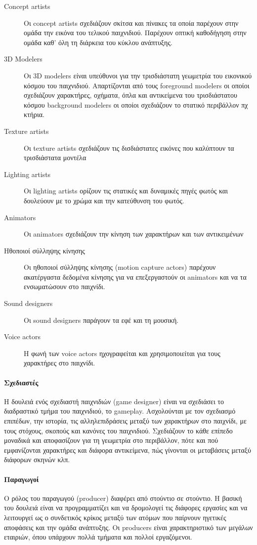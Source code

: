 	\begin{description}
		\item [Concept artists] 
		Οι concept artists σχεδιάζουν σκίτσα και πίνακες τα οποία παρέχουν στην ομάδα την εικόνα του τελικού παιχνιδιού. Παρέχουν οπτική καθοδήγηση στην ομάδα καθ' όλη τη διάρκεια του κύκλου ανάπτυξης.
		\item [3D Modelers]
	    Οι 3D modelers είναι υπεύθυνοι για την τρισδιάστατη γεωμετρία του εικονικού κόσμου του παιχνιδιού. Απαρτίζονται από τους
		foreground modelers οι οποίοι σχεδιάζουν χαρακτήρες, οχήματα, όπλα και αντικείμενα του τρισδιάστατου κόσμου
		background modelers οι οποίοι σχεδιάζουν το στατικό περιβάλλον πχ κτήρια.
		\item [Texture artists] Οι texture artists σχεδιάζουν τις δισδιάστατες εικόνες που καλύπτουν τα τρισδιάστατα μοντέλα
		\item [Lighting artists] Οι lighting artists ορίζουν τις στατικές και δυναμικές πηγές φωτός και δουλεύουν με το χρώμα και την κατεύθυνση του φωτός.
		\item [Animators] Οι animators σχεδιάζουν την κίνηση των χαρακτήρων και των αντικειμένων
		\item [Ηθοποιοί σύλληψης κίνησης] Οι ηθοποιοί σύλληψης κίνησης (motion capture actors) παρέχουν ακατέργαστα δεδομένα κίνησης για να επεξεργαστούν οι animators και να τα ενσωματώσουν στο παιχνίδι.
		\item [Sound designers] Οι sound designers παράγουν τα εφέ και τη μουσική.
		\item [Voice actors] H φωνή των voice actors ηχογραφείται και χρησιμοποιείται για τους χαρακτήρες στο παιχνίδι.
	\end{description}
	
	\paragraph{Σχεδιαστές}
	Η δουλειά ενός σχεδιαστή παιχνιδιών (game designer) είναι να σχεδιάσει το διαδραστικό τμήμα του παιχνιδιού, το gameplay. Ασχολούνται με τον σχεδιασμό επιπέδων, την ιστορία, τις αλληλεπιδράσεις μεταξύ των χαρακτήρων στο παιχνίδι, με τους στόχους, σκοπούς και κανόνες του παιχνιδιού.
	Σχεδιάζουν το κάθε επίπεδο μοναδικά και αποφασίζουν για τη γεωμετρία στο περιβάλλον, πότε και πού εμφανίζονται χαρακτήρες και διάφορα αντικείμενα, πώς γίνονται οι μεταβάσεις μεταξύ διάφορων σκηνών κλπ.
	
	\paragraph{Παραγωγοί}
	Ο ρόλος του παραγωγού (producer) διαφέρει από στούντιο σε στούντιο. Η βασική του δουλειά είναι να προγραμματίζει και να δρομολογεί τις διάφορες εργασίες και να λειτουργεί ως ο συνδετικός κρίκος μεταξύ των ατόμων που παίρνουν ηγετικές αποφάσεις και την ομάδα ανάπτυξης. Οι producers είναι χαρακτηριστικό των μεγάλων εταιριών, όπου υπάρχουν πολλά τμήματα και πολλοί εργαζόμενοι.	
	
